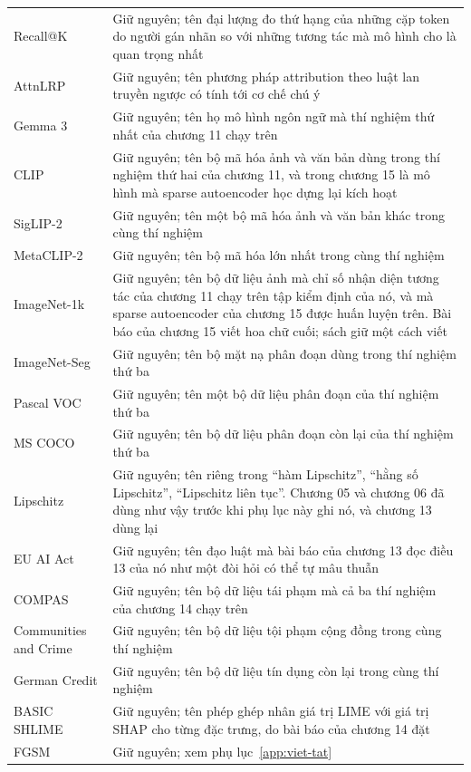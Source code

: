 \begin{longtable}{@{}lp{7cm}@{}}
Recall@K & Giữ nguyên; tên đại lượng đo thứ hạng của những cặp token do người gán nhãn so với những tương tác mà mô hình cho là quan trọng nhất \\
AttnLRP & Giữ nguyên; tên phương pháp attribution theo luật lan truyền ngược có tính tới cơ chế chú ý \\
Gemma 3 & Giữ nguyên; tên họ mô hình ngôn ngữ mà thí nghiệm thứ nhất của chương 11 chạy trên \\
CLIP & Giữ nguyên; tên bộ mã hóa ảnh và văn bản dùng trong thí nghiệm thứ hai của chương 11, và trong chương 15 là mô hình mà sparse autoencoder học dựng lại kích hoạt \\
SigLIP-2 & Giữ nguyên; tên một bộ mã hóa ảnh và văn bản khác trong cùng thí nghiệm \\
MetaCLIP-2 & Giữ nguyên; tên bộ mã hóa lớn nhất trong cùng thí nghiệm \\
ImageNet-1k & Giữ nguyên; tên bộ dữ liệu ảnh mà chỉ số nhận diện tương tác của chương 11 chạy trên tập kiểm định của nó, và mà sparse autoencoder của chương 15 được huấn luyện trên. Bài báo của chương 15 viết hoa chữ cuối; sách giữ một cách viết \\
ImageNet-Seg & Giữ nguyên; tên bộ mặt nạ phân đoạn dùng trong thí nghiệm thứ ba \\
Pascal VOC & Giữ nguyên; tên một bộ dữ liệu phân đoạn của thí nghiệm thứ ba \\
MS COCO & Giữ nguyên; tên bộ dữ liệu phân đoạn còn lại của thí nghiệm thứ ba \\
Lipschitz & Giữ nguyên; tên riêng trong \enquote{hàm Lipschitz}, \enquote{hằng số Lipschitz}, \enquote{Lipschitz liên tục}. Chương 05 và chương 06 đã dùng như vậy trước khi phụ lục này ghi nó, và chương 13 dùng lại \\
EU AI Act & Giữ nguyên; tên đạo luật mà bài báo của chương 13 đọc điều 13 của nó như một đòi hỏi có thể tự mâu thuẫn \\
COMPAS & Giữ nguyên; tên bộ dữ liệu tái phạm mà cả ba thí nghiệm của chương 14 chạy trên \\
Communities and Crime & Giữ nguyên; tên bộ dữ liệu tội phạm cộng đồng trong cùng thí nghiệm \\
German Credit & Giữ nguyên; tên bộ dữ liệu tín dụng còn lại trong cùng thí nghiệm \\
BASIC SHLIME & Giữ nguyên; tên phép ghép nhân giá trị LIME với giá trị SHAP cho từng đặc trưng, do bài báo của chương 14 đặt \\
FGSM & Giữ nguyên; xem phụ lục~\ref{app:viet-tat} \\

\end{longtable}
